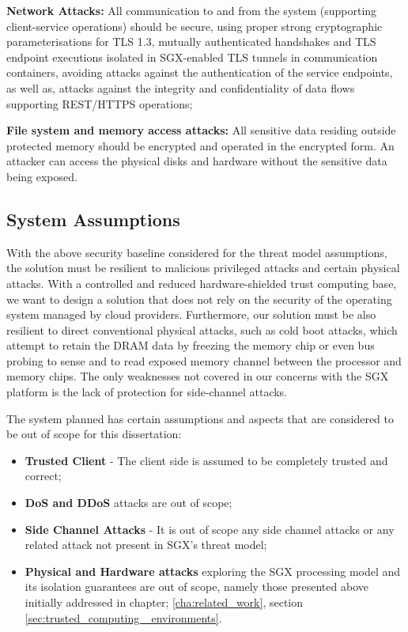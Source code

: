 \textbf{Network Attacks:} All communication to and from the system (supporting client-service operations) should be secure, using proper strong cryptographic parameterisations for \gls{TLS} 1.3, mutually authenticated handshakes and TLS endpoint executions isolated in SGX-enabled \gls{TLS} tunnels in communication containers, avoiding attacks against the authentication of the service endpoints, as well as, attacks against the integrity and confidentiality of data flows supporting \gls{REST}/\gls{HTTPS} operations;

\textbf{File system and memory access attacks:} All sensitive data residing outside protected memory should be encrypted and operated in the encrypted form. An attacker can access the physical disks and hardware without the sensitive data being exposed.
	
\subsection{System Assumptions}
\label{ssec:other_system_assumptions}

With the above security baseline considered for the threat model assumptions, the solution must be resilient to malicious privileged attacks and certain physical attacks. With a controlled and reduced hardware-shielded trust computing base, we want to design a solution that does not rely on the security of the operating system managed by cloud providers. Furthermore, our solution must be also resilient to direct conventional physical attacks, such as cold boot attacks, which attempt to retain the DRAM data by freezing the memory chip or even bus probing to sense and to read exposed memory channel between the processor and memory chips. The only weaknesses not covered in our concerns with the SGX platform is the lack of protection for side-channel attacks.

The system planned has certain assumptions and aspects that are considered to be out of scope for this dissertation:

\begin{itemize}
	\item \textbf{Trusted Client} - The client side is assumed to be completely trusted and correct;
	\item \textbf{\gls{DoS} and \gls{DDoS}} attacks are out of scope;
	\item \textbf{Side Channel Attacks} - It is out of scope any side channel attacks or any related attack not present in \gls{SGX}'s threat model;
	\item \textbf{Physical and Hardware attacks} exploring the \gls{SGX} processing model and its isolation guarantees are out of scope, namely those presented above initially addressed in chapter; \ref{cha:related_work}, section \ref{sec:trusted_computing _environments}.
\end{itemize}

